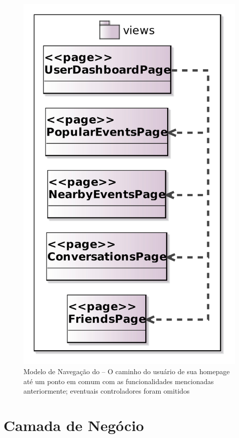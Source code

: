 \begin{figure}[H]
	\centering
	\includegraphics[scale=0.1]{figuras/FrameWebNavigationModel6.jpg}
	\caption{Modelo de Navegação do \imprimirtitulo{} -- O caminho do usuário de sua homepage até um ponto em comum com as funcionalidades mencionadas anteriormente; eventuais controladores foram omitidos}
	\label{fig:nav6}
\end{figure}




\section{Camada de Negócio}
\label{sec-arquitetura-negocio}

